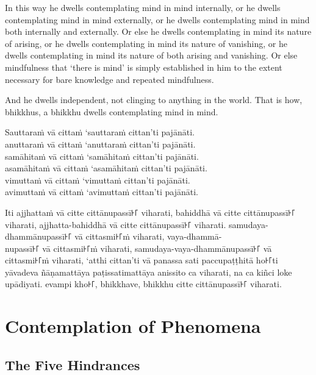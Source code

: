 In this way he dwells contemplating mind in mind internally, or he dwells
contemplating mind in mind externally, or he dwells contemplating mind in mind
both internally and externally. Or else he dwells contemplating in mind its
nature of arising, or he dwells contemplating in mind its nature of vanishing,
or he dwells contemplating in mind its nature of both arising and vanishing. Or
else mindfulness that ‘there is mind’ is simply established in him to the extent
necessary for bare knowledge and repeated mindfulness.

And he dwells independent, not clinging to anything in the world. That is how,
bhikkhus, a bhikkhu dwells contemplating mind in mind.


\paliPage

Sauttaraṁ vā cittaṁ ‘sauttaraṁ cittan’ti pajānāti.\\
anuttaraṁ vā cittaṁ ‘anuttaraṁ cittan’ti pajānāti.\\
samāhitaṁ vā cittaṁ ‘samāhitaṁ cittan’ti pajānāti.\\
asamāhitaṁ vā cittaṁ ‘asamāhitaṁ cittan’ti pajānāti.\\
vimuttaṁ vā cittaṁ ‘vimuttaṁ cittan’ti pajānāti.\\
avimuttaṁ vā cittaṁ ‘avimuttaṁ cittan’ti pajānāti.

Iti ajjhattaṁ vā citte cittānupassī꜔꜒ viharati, bahiddhā vā citte cittānupassī꜔꜒
viharati, ajjhatta-bahiddhā vā citte cittānupassī꜔꜒ viharati.
samudaya-dhammānupassī꜔꜒ vā cittasmi꜔꜒ṁ viharati, vaya-dhammā-\\
nupassī꜔꜒ vā cittasmi꜔꜒ṁ viharati, samudaya-vaya-dhammānupassī꜔꜒ vā cittasmi꜔꜒ṁ
viharati, ‘atthi cittan’ti vā panassa sati paccupaṭṭhitā ho꜔꜒ti yāvadeva
ñāṇamattāya paṭissatimattāya anissito ca viharati, na ca kiñci loke upādiyati.
evampi kho꜔꜒, bhikkhave, bhikkhu citte cittānupassī꜔꜒ viharati.


\englishPage

\paliPage

\englishPage
\chapter{Contemplation of Phenomena}

\section{The Five Hindrances}

